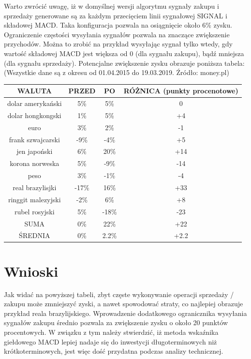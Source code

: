 \documentclass{article} %
\begin{document}
Warto zwrócić uwagę, iż w domyślnej wersji algorytmu sygnały zakupu i sprzedaży generowane są za każdym przecięciem 
linii sygnałowej SIGNAL i składowej MACD.
Taka konfiguracja pozwala na osiągnięcie około 6\% zysku. \\
Ograniczenie częstości wysyłania sygnałów pozwala na znaczące zwiększenie przychodów. Można to zrobić na przykład wysyłając sygnał
tylko wtedy, gdy wartość składowej MACD jest większa od 0 (dla sygnału zakupu), 
bądź mniejsza (dla sygnału sprzedaży). Potencjalne zwiększenie zysku obrazuje poniższa tabela: (Wszystkie dane są z okresu od 01.04.2015 do 19.03.2019. Źródło: money.pl) \\
\begin{center} 
    \begin{tabular}  { | c || c | c || c |  }
        \hline
        WALUTA & PRZED & PO & RÓŻNICA (punkty procenotowe) \\
        \hline
        \hline
        dolar amerykański & 5\% & 5\% & 0 \\
        \hline
        dolar hongkongski & 1\% & 5\% & +4 \\
        \hline
        euro & 3\% & 2\% & -1 \\
        \hline
        frank szwajcarski & -9\% & -4\% & +5 \\
        \hline
        jen japoński & 6\% & 20\% & +14 \\
        \hline
        korona norweska & 5\% & -9\% & -14 \\
        \hline
        peso & 3\% & -1\% & -4 \\
        \hline 
        real brazylisjki & -17\% & 16\% & +33 \\
        \hline
        ringgit malezyjski & -2\% & 6\% & +8 \\
        \hline 
        rubel rosyjski & 5\% & -18\% & -23 \\
        \hline
        \hline
        SUMA & 0\% & 22\% & +22 \\
        \hline
        ŚREDNIA & 0\% & 2.2\% & +2.2 \\
        \hline
    \end{tabular}
\end{center}
\newpage
\section{Wnioski}
Jak widać na powyższej tabeli, zbyt częste wykonywanie operacji sprzedaży / zakupu może zmniejszyć zyski,
 a nawet spowodować straty, co najlepiej obrazuje przykład reala brazylijskiego. Wprowadzenie dodatkowego ogranicznika wysyłania sygnałów zakupu średnio pozwala za zwiększenie zysku o około 20 punktów procentowych. W związku z tym należy stwierdzić,
  iż metoda wskaźnika giełdowego MACD lepiej nadaje się do inwestycji długoterminowych niż krótkoterminowych, 
  jest więc dość przydatna podczas analizy technicznej.
\end{document}
